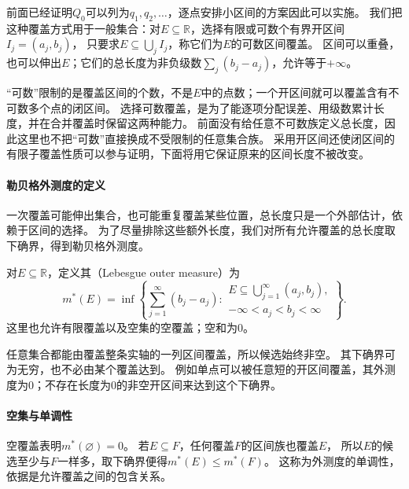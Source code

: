 前面已经证明$Q_0$可以列为$q_1,q_2,\ldots$，逐点安排小区间的方案因此可以实施。
我们把这种覆盖方式用于一般集合：对$E\subseteq\mathbb R$，选择有限或可数个有界开区间$I_j=(a_j,b_j)$，
只要求$E\subseteq\bigcup_j I_j$，称它们为$E$的可数区间覆盖。
区间可以重叠，也可以伸出$E$；它们的总长度为非负级数$\sum_j(b_j-a_j)$，允许等于$+\infty$。

“可数”限制的是覆盖区间的个数，不是$E$中的点数；一个开区间就可以覆盖含有不可数多个点的闭区间。
选择可数覆盖，是为了能逐项分配误差、用级数累计长度，并在合并覆盖时保留这两种能力。
前面没有给任意不可数族定义总长度，因此这里也不把“可数”直接换成不受限制的任意集合族。
采用开区间还使闭区间的有限子覆盖性质可以参与证明，下面将用它保证原来的区间长度不被改变。

\paragraph{勒贝格外测度的定义}

一次覆盖可能伸出集合，也可能重复覆盖某些位置，总长度只是一个外部估计，依赖于区间的选择。
为了尽量排除这些额外长度，我们对所有允许覆盖的总长度取下确界，得到勒贝格外测度。
\begin{definition}[勒贝格外测度]
\label{def:analysis-lebesgue-outer-measure}
对$E\subseteq\mathbb R$，定义其（Lebesgue outer measure）为
\begin{equation}
 m^*(E)=\inf\left\{\sum_{j=1}^{\infty}(b_j-a_j):
 \begin{array}{l}
 E\subseteq\bigcup_{j=1}^{\infty}(a_j,b_j),\\
 -\infty<a_j<b_j<\infty
 \end{array}\right\}.
 \label{eq:comb-lebesgue-outer-measure}
\end{equation}
这里也允许有限覆盖以及空集的空覆盖；空和为$0$。
\end{definition}

任意集合都能由覆盖整条实轴的一列区间覆盖，所以候选始终非空。
其下确界可为无穷，也不必由某个覆盖达到。
例如单点可以被任意短的开区间覆盖，其外测度为$0$；不存在长度为$0$的非空开区间来达到这个下确界。

\paragraph{空集与单调性}

空覆盖表明$m^*(\varnothing)=0$。
若$E\subseteq F$，任何覆盖$F$的区间族也覆盖$E$，
所以$E$的候选至少与$F$一样多，取下确界便得$m^*(E)\leq m^*(F)$。
这称为外测度的单调性，依据是允许覆盖之间的包含关系。

